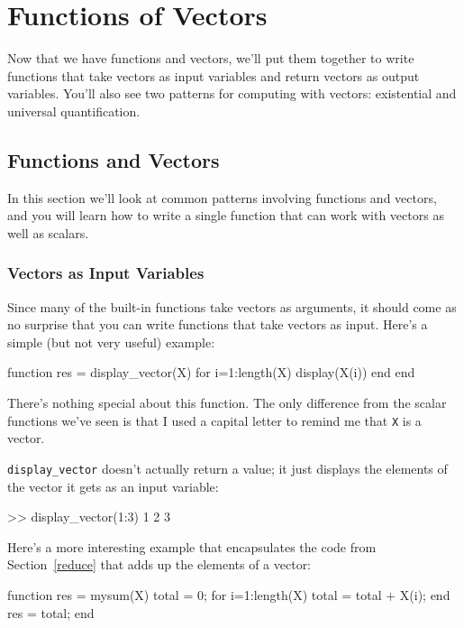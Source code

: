 \chapter{Functions of Vectors}
\minitoc

Now that we have functions and vectors, we'll put them together to write functions that take vectors as input variables and return vectors as output variables.  You'll also see two patterns for computing with vectors: existential and universal quantification.


\section{Functions and Vectors}

In this section we'll look at common patterns involving functions and vectors, and you will learn how to write a single function that can work with vectors as well as scalars.

\subsection{Vectors as Input Variables}

Since many of the built-in functions take vectors as arguments,
it should come as no surprise that you can write functions that
take vectors as input.  Here's a simple (but not very useful) example:


\begin{code}
function res = display_vector(X)
    for i=1:length(X)
        display(X(i))
    end
end
\end{code}

There's nothing special about this function.  The only
difference from the scalar functions we've seen is that I used
a capital letter to remind me that {\tt X} is a vector.

\verb"display_vector" doesn't actually return a value; it just displays the elements of the vector it gets as an input variable:

\begin{code}
>> display_vector(1:3)
    1
    2
    3
\end{code}

Here's a more interesting example that encapsulates the code
from Section~\ref{reduce} that adds up the elements of a vector:


\begin{code}
function res = mysum(X)
    total = 0;
    for i=1:length(X)
        total = total + X(i);
    end
    res = total;
end
\end{code}


